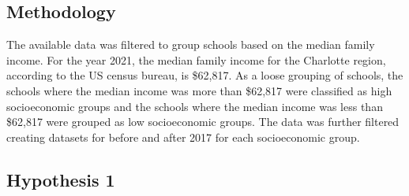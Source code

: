 \subsection{Methodology}
The available data was filtered to group schools based on the median family income. 
For the year 2021, the median family income for the Charlotte region, according to the US census bureau, is \$62,817. 
As a loose grouping of schools, the schools where the median income was more than \$62,817 were classified as high socioeconomic groups and the schools where the median income was less than \$62,817 were grouped as low socioeconomic groups. 
The data was further filtered  creating datasets for before and after 2017 for each socioeconomic group. 

\subsection{Hypothesis 1}


